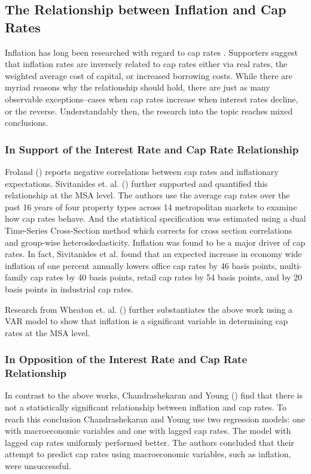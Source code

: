 \documentclass[jrfm,article,submit,oneauthor,pdftex]{Definitions/mdpi}
\begin{document}
\subsection{The Relationship between Inflation and Cap Rates}

Inflation has long been researched with regard to cap rates \citep*{froland1987determines, sivitanides2001determinants, chandrashekaran2000predictability}. Supporters suggest that inflation rates are inversely related to cap rates either via real rates, the weighted average  cost of capital, or increased borrowing costs. While there are myriad reasons why the relationship should hold, there are just as many observable exceptions--cases when cap rates increase when interest rates decline, or the reverse. Understandably then, the research into the topic reaches mixed conclusions.

\subsubsection{In Support of the Interest Rate and Cap Rate Relationship}
Froland (\citeyear{froland1987determines}) reports negative correlations between cap rates and inflationary expectations. Sivitanides et. al. (\citeyear{sivitanides2001determinants}) further supported and quantified this relationship at the MSA level. The authors use the average cap rates over the past 16 years of four property types across 14 metropolitan markets to examine how cap rates behave. And the statistical specification was estimated using a dual Time-Series Cross-Section method which corrects for cross section correlations and group-wise heteroskedasticity. Inflation was found to be a major driver of cap rates. In fact, Sivitanides et al. found that an expected increase in economy wide inflation of one percent annually lowers office cap rates by 46 basis points, multi-family cap rates by 40 basis points, retail cap rates by 54 basis points, and by 20 basis points in industrial cap rates.

Research from Wheaton et. al. (\citeyear{wheaton2001real}) further substantiates the above work using a VAR model to show that inflation is a significant variable in determining cap rates at the MSA level. 

\subsubsection{In Opposition of the Interest Rate and Cap Rate Relationship}
In contrast to the above works, Chandrashekaran and Young (\citeyear{chandrashekaran2000predictability}) find that there is not a statistically significant relationship between inflation and cap rates. To reach this conclusion Chandrashekaran and Young use two regression models: one with macroeconomic variables and one with lagged cap rates. The model with lagged cap rates uniformly performed better. The authors concluded that their attempt to predict cap rates using macroeconomic variables, such as inflation, were unsuccessful. 
\end{document}
